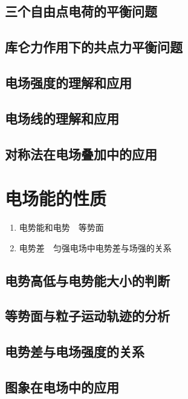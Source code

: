 \documentclass[cn,11pt, simple]{elegantbook}
\begin{document}
\clearpage\section{三个自由点电荷的平衡问题}

\clearpage\section{库仑力作用下的共点力平衡问题}

\clearpage\section{电场强度的理解和应用}

\clearpage\section{电场线的理解和应用}

\clearpage\section{对称法在电场叠加中的应用}
\chapter{电场能的性质}
\begin{enumerate}
   \item 电势能和电势　等势面
   \item 电势差　匀强电场中电势差与场强的关系
\end{enumerate}

\clearpage\section{电势高低与电势能大小的判断}

\clearpage\section{等势面与粒子运动轨迹的分析}

\clearpage\section{电势差与电场强度的关系}

\clearpage\section{图象在电场中的应用}
\end{document}
